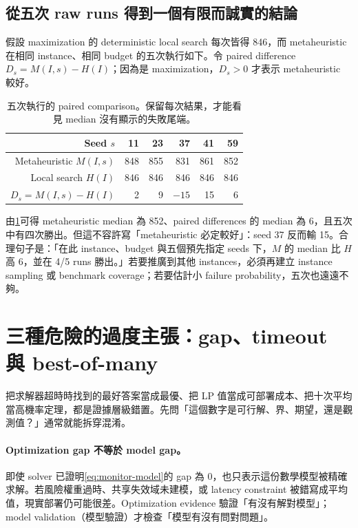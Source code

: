 \documentclass[11pt,a4paper,oneside,openany]{book}
\begin{document}
\subsection{從五次 raw runs 得到一個有限而誠實的結論}
假設 maximization 的 deterministic local search 每次皆得 846，而 metaheuristic 在相同 instance、相同 budget 的五次執行如下。令 paired difference $D_s=M(I,s)-H(I)$；因為是 maximization，$D_s>0$ 才表示 metaheuristic 較好。

\begin{table}[htbp]
\centering
\caption{五次執行的 paired comparison。保留每次結果，才能看見 median 沒有顯示的失敗尾端。}
\begin{tabular}{@{}rrrrrr@{}}
\toprule
Seed $s$ & 11 & 23 & 37 & 41 & 59 \\
\midrule
Metaheuristic $M(I,s)$ & 848 & 855 & 831 & 861 & 852 \\
Local search $H(I)$    & 846 & 846 & 846 & 846 & 846 \\
$D_s=M(I,s)-H(I)$      & 2   & 9   & $-15$ & 15 & 6 \\
\bottomrule
\end{tabular}
\label{tab:paired-runs}
\end{table}

由\cref{tab:paired-runs}可得 metaheuristic median 為 852、paired differences 的 median 為 6，且五次中有四次勝出。但這不容許寫「metaheuristic 必定較好」：seed 37 反而輸 15。合理句子是：「在此 instance、budget 與五個預先指定 seeds 下，$M$ 的 median 比 $H$ 高 6，並在 4/5 runs 勝出。」若要推廣到其他 instances，必須再建立 instance sampling 或 benchmark coverage；若要估計小 failure probability，五次也遠遠不夠。

\section{三種危險的過度主張：gap、timeout 與 best-of-many}
\begin{misconception}
把求解器超時時找到的最好答案當成最優、把 LP 值當成可部署成本、把十次平均當高機率定理，都是證據層級錯置。先問「這個數字是可行解、界、期望，還是觀測值？」通常就能拆穿混淆。
\end{misconception}

\paragraph{Optimization gap 不等於 model gap。}
即使 solver 已證明\cref{eq:monitor-model}的 gap 為 0，也只表示這份數學模型被精確求解。若風險權重過時、共享失效域未建模，或 latency constraint 被錯寫成平均值，現實部署仍可能很差。Optimization evidence 驗證「有沒有解對模型」；model validation（模型驗證）才檢查「模型有沒有問對問題」。
\end{document}
